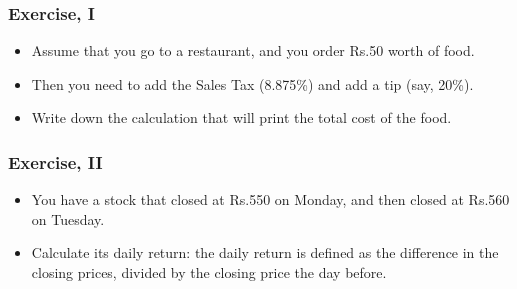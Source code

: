 



\begin{frame}[fragile]\frametitle{Exercise, I}
\begin{itemize}
\item Assume that you go to a restaurant, and you order Rs.50 worth of food. 
\item Then you need to add the Sales Tax (8.875\%) and add a tip (say, 20\%). 
\item Write down the calculation that will print the total cost of the food.
\end{itemize}
\end{frame}
\begin{frame}[fragile]\frametitle{Exercise, II}
\begin{itemize}
\item You have a stock that closed at Rs.550 on Monday, and then closed at Rs.560 on Tuesday.
\item Calculate its daily return: the daily return is defined as the difference in the closing prices, divided by the closing price the day before.
\end{itemize}
\end{frame}

